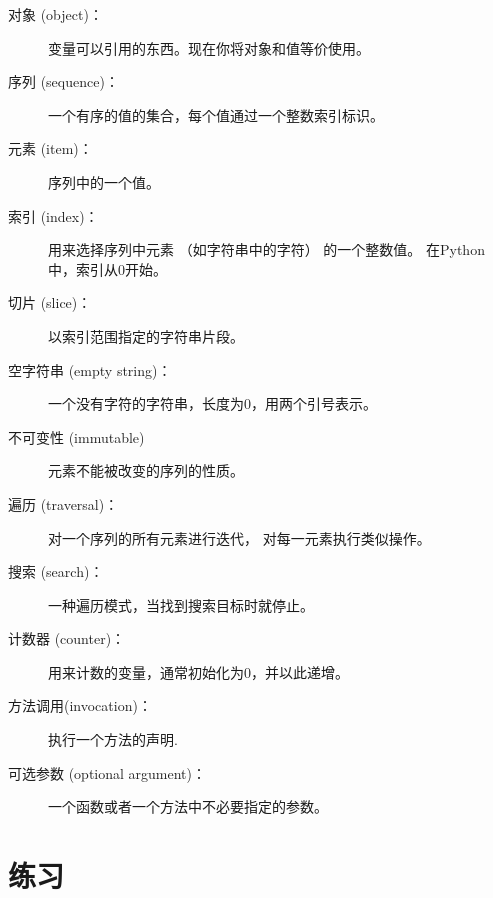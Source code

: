 \begin{description}

\item[对象 (object)：] 变量可以引用的东西。现在你将对象和值等价使用。

\item[序列 (sequence)：] 一个有序的值的集合，每个值通过一个整数索引标识。

\item[元素 (item)：] 序列中的一个值。

\item[索引 (index)：] 用来选择序列中元素 （如字符串中的字符） 的一个整数值。 在Python中，索引从0开始。

\item[切片 (slice)：] 以索引范围指定的字符串片段。

\item[空字符串 (empty string)：] 一个没有字符的字符串，长度为0，用两个引号表示。

\item[不可变性 (immutable)] 元素不能被改变的序列的性质。

\item[遍历 (traversal)：] 对一个序列的所有元素进行迭代， 对每一元素执行类似操作。

\item[搜索 (search)：] 一种遍历模式，当找到搜索目标时就停止。
  

\item[计数器 (counter)：] 用来计数的变量，通常初始化为0，并以此递增。

\item[方法调用(invocation)：] 执行一个方法的声明.

\item[可选参数 (optional argument)：] 一个函数或者一个方法中不必要指定的参数。
  

\end{description}


\section{练习}


